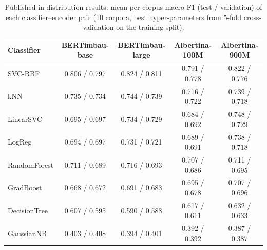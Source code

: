 \begin{table}[t]
\centering
\small
\caption{Published in-distribution results: mean per-corpus macro-F1 (test / validation) of each classifier--encoder pair (10 corpora, best hyper-parameters from 5-fold cross-validation on the training split).}
\label{tab:b-table4}
\begin{tabular}{lcccc}
\toprule
Classifier & BERTimbau-base & BERTimbau-large & Albertina-100M & Albertina-900M \\
\midrule
SVC-RBF & 0.806 / 0.797 & 0.824 / 0.811 & 0.791 / 0.778 & 0.822 / 0.776 \\
kNN & 0.735 / 0.734 & 0.744 / 0.739 & 0.716 / 0.722 & 0.739 / 0.718 \\
LinearSVC & 0.695 / 0.697 & 0.734 / 0.729 & 0.684 / 0.692 & 0.748 / 0.729 \\
LogReg & 0.694 / 0.697 & 0.731 / 0.721 & 0.689 / 0.691 & 0.738 / 0.718 \\
RandomForest & 0.711 / 0.689 & 0.716 / 0.693 & 0.707 / 0.686 & 0.711 / 0.695 \\
GradBoost & 0.668 / 0.672 & 0.691 / 0.683 & 0.695 / 0.678 & 0.707 / 0.696 \\
DecisionTree & 0.607 / 0.595 & 0.590 / 0.588 & 0.617 / 0.611 & 0.632 / 0.633 \\
GaussianNB & 0.403 / 0.408 & 0.394 / 0.401 & 0.392 / 0.392 & 0.387 / 0.387 \\
\bottomrule
\end{tabular}
\end{table}
